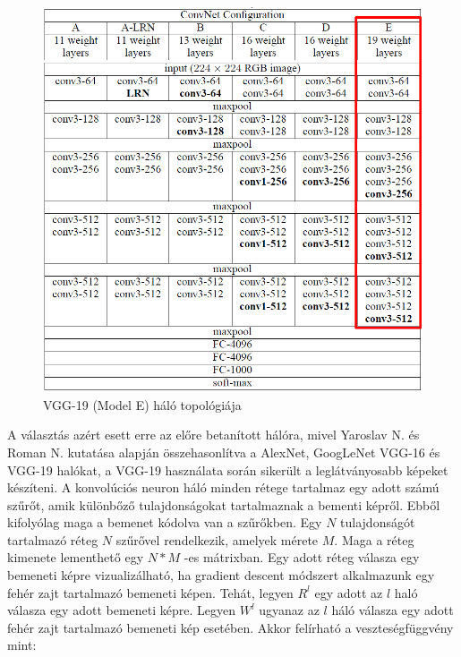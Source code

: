 \documentclass[12pt, a4paper, oneside]{book}
\theoremstyle{tetel}
\begin{document}
\begin{figure}[!htbp]
	\begin{center}
		\includegraphics[scale=0.3]{VGG19.png}
		\caption{VGG-19 (Model E) háló topológiája\cite{29}}
		\label{vgg_19}
	\end{center}
\end{figure}

A választás azért esett erre az előre betanított hálóra, mivel Yaroslav N. és Roman N. kutatása alapján\cite{16} összehasonlítva a AlexNet, GoogLeNet VGG-16 és VGG-19 halókat, a VGG-19 használata során sikerült a leglátványosabb képeket készíteni.
\newline
\indent
A konvolúciós neuron háló minden rétege tartalmaz egy adott számú szűrőt, amik különbőző tulajdonságokat tartalmaznak a bementi képről. Ebből kifolyólag maga a bemenet kódolva van a szűrőkben. Egy \(N\) tulajdonságót tartalmazó réteg \(N\) szűrővel rendelkezik, amelyek mérete \(M\). Maga a réteg kimenete lementhető egy \(N * M\) -es mátrixban. Egy adott réteg válasza egy bemeneti képre vizualizálható, ha gradient descent módszert alkalmazunk egy fehér zajt tartalmazó bemeneti képen. Tehát, legyen \(R^l\) egy adott az \(l\) haló válasza egy adott bemeneti képre. Legyen \(W^l\) ugyanaz az \(l\) háló válasza egy adott fehér zajt tartalmazó bemeneti kép esetében. Akkor felírható a veszteségfüggvény mint:
\end{document}
